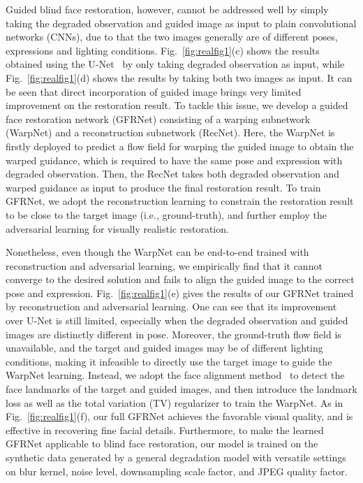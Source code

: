 \documentclass[runningheads]{llncs}
\begin{document}
Guided blind face restoration, however, cannot be addressed well by simply taking the degraded observation and guided image as input to plain convolutional networks (CNNs), due to that the two images generally are of different poses, expressions and lighting conditions.
Fig.~\ref{fig:realfig1}(c) shows the results obtained using the U-Net~\cite{ronneberger2015u} by only taking degraded observation as input, while Fig.~\ref{fig:realfig1}(d) shows the results by taking both two images as input.
It can be seen that direct incorporation of guided image brings very limited improvement on the restoration result.
To tackle this issue, we develop a guided {face} restoration network (GFRNet) consisting of a warping subnetwork (WarpNet) and a reconstruction subnetwork (RecNet).
Here, the WarpNet is firstly deployed to predict a flow field for warping the guided image to obtain the warped guidance, which is required to have the same pose and expression with degraded observation.
Then, the RecNet takes both degraded observation and warped guidance as input to produce the final restoration result.
To train GFRNet, we adopt the reconstruction learning to constrain the restoration result to be close to the target image (i.e., ground-truth), and further employ the adversarial learning for visually realistic restoration.

Nonetheless, even though the WarpNet can be end-to-end trained with reconstruction and adversarial learning, we empirically find that it cannot converge to the desired solution and fails to align the guided image to the correct pose and expression.
Fig.~\ref{fig:realfig1}(e) gives the results of our GFRNet trained by reconstruction and adversarial learning.
One can see that its improvement over U-Net is still limited, especially when the degraded observation and guided images are distinctly different in pose.
Moreover, the ground-truth flow field is unavailable, and the target and guided images may be of different lighting conditions, making it infeasible to directly use the target image to guide the WarpNet learning.
Instead, we adopt the face alignment method~\cite{TCDCN} to detect the face landmarks of the target and guided images, and then introduce the landmark loss as well as the total variation (TV) regularizer to train the WarpNet.
{As in} Fig.~\ref{fig:realfig1}(f), our full GFRNet achieves the favorable visual quality, and is effective in recovering fine facial details.
Furthermore, to make the learned GFRNet applicable to blind face restoration, our model is trained on the synthetic data generated by a general degradation model with versatile settings on blur kernel, noise level, downsampling scale factor, and JPEG quality factor.
\end{document}
